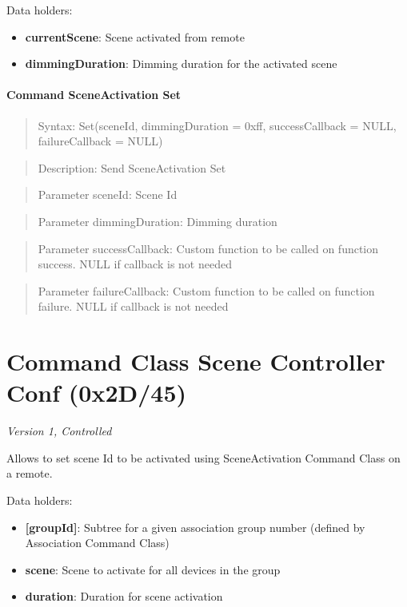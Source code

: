 \noindent
Data holders:

\begin{itemize}
\item \textbf{currentScene}: Scene activated from remote
\item \textbf{dimmingDuration}: Dimming duration for the activated scene
\end{itemize}

\paragraph{Command SceneActivation Set}
\begin{quote}Syntax: Set(sceneId, dimmingDuration = 0xff, successCallback = NULL, failureCallback = NULL)\end{quote}
\begin{quote}Description: Send SceneActivation Set\end{quote}
\begin{quote}Parameter sceneId: Scene Id\end{quote}
\begin{quote}Parameter dimmingDuration: Dimming duration\end{quote}
\begin{quote}Parameter successCallback: Custom function to be called on function success. NULL if callback is not needed\end{quote}
\begin{quote}Parameter failureCallback: Custom function to be called on function failure. NULL if callback is not needed\end{quote}



\section{Command Class Scene Controller Conf (0x2D/45)}

\textit{Version 1, Controlled}
\newline

Allows to set scene Id to be activated using SceneActivation Command Class on a remote.
\newline

\noindent
Data holders:

\begin{itemize}
\item \textbf{[groupId]}: Subtree for a given association group number (defined by Association Command Class)
\item \qquad\textbf{scene}: Scene to activate for all devices in the group
\item \qquad\textbf{duration}: Duration for scene activation
\end{itemize}

